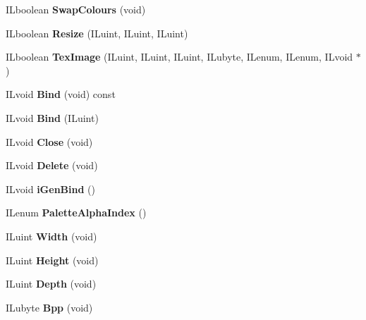 \begin{DoxyCompactItemize}
I\+Lboolean {\bfseries Swap\+Colours} (void)
\item 
\mbox{\label{classilImage_aeefe83c3a39c37600868c29d4afb8294}} 
I\+Lboolean {\bfseries Resize} (I\+Luint, I\+Luint, I\+Luint)
\item 
\mbox{\label{classilImage_a06975135177b41ea110cc562944612f4}} 
I\+Lboolean {\bfseries Tex\+Image} (I\+Luint, I\+Luint, I\+Luint, I\+Lubyte, I\+Lenum, I\+Lenum, I\+Lvoid $\ast$)
\item 
\mbox{\label{classilImage_ac38b81754fb5536b612d91f0e6fc3376}} 
I\+Lvoid {\bfseries Bind} (void) const
\item 
\mbox{\label{classilImage_a357703ce3155b430ba8997e109d15a1c}} 
I\+Lvoid {\bfseries Bind} (I\+Luint)
\item 
\mbox{\label{classilImage_af8ed3cbec5f5f8cfcd4f3aff0ef48249}} 
I\+Lvoid {\bfseries Close} (void)
\item 
\mbox{\label{classilImage_ae584be4bfa1a207b587e58a4b445efdf}} 
I\+Lvoid {\bfseries Delete} (void)
\item 
\mbox{\label{classilImage_a0480085d8d9f73c1858996271d32f878}} 
I\+Lvoid {\bfseries i\+Gen\+Bind} ()
\item 
\mbox{\label{classilImage_a800df9d1c1202948f48bd4091f26af08}} 
I\+Lenum {\bfseries Palette\+Alpha\+Index} ()
\item 
\mbox{\label{classilImage_ab24327ced02bb479cc2c27309c04b0cf}} 
I\+Luint {\bfseries Width} (void)
\item 
\mbox{\label{classilImage_a1bced3b8c52d8b5c4c057ace1f63f50f}} 
I\+Luint {\bfseries Height} (void)
\item 
\mbox{\label{classilImage_a83dbdb8fbd6a3eebca207deb754ec505}} 
I\+Luint {\bfseries Depth} (void)
\item 
\mbox{\label{classilImage_a3f608389405b448ac38f507d5264b10c}} 
I\+Lubyte {\bfseries Bpp} (void)

\end{DoxyCompactItemize}
